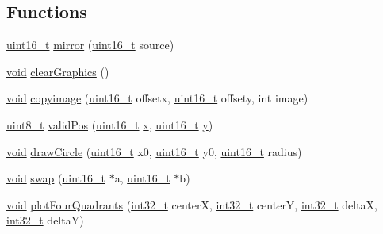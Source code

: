 \subsection*{Functions}
\begin{DoxyCompactItemize}
\item 
\hyperlink{stdint_8h_a273cf69d639a59973b6019625df33e30}{uint16\-\_\-t} \hyperlink{group___o_s_d_g_e_n_module_ga5a45071c8d6dc7fb048d5f791831b868}{mirror} (\hyperlink{stdint_8h_a273cf69d639a59973b6019625df33e30}{uint16\-\_\-t} source)
\item 
\hyperlink{group___n_a_m_e_ga18028b8badbf1ea7e704ccac3c488e82}{void} \hyperlink{group___o_s_d_g_e_n_module_gaef4730e1cc093c1b98a70d8e9241c3de}{clear\-Graphics} ()
\item 
\hyperlink{group___n_a_m_e_ga18028b8badbf1ea7e704ccac3c488e82}{void} \hyperlink{group___o_s_d_g_e_n_module_gaddad1c4131ec096796b78d23a4082da6}{copyimage} (\hyperlink{stdint_8h_a273cf69d639a59973b6019625df33e30}{uint16\-\_\-t} offsetx, \hyperlink{stdint_8h_a273cf69d639a59973b6019625df33e30}{uint16\-\_\-t} offsety, int image)
\item 
\hyperlink{stdint_8h_aba7bc1797add20fe3efdf37ced1182c5}{uint8\-\_\-t} \hyperlink{group___o_s_d_g_e_n_module_ga2f47e18d66eab4b942c583d519b122d8}{valid\-Pos} (\hyperlink{stdint_8h_a273cf69d639a59973b6019625df33e30}{uint16\-\_\-t} \hyperlink{pios__opahrs__proto_8h_ad0da36b2558901e21e7a30f6c227a45e}{x}, \hyperlink{stdint_8h_a273cf69d639a59973b6019625df33e30}{uint16\-\_\-t} \hyperlink{pios__opahrs__proto_8h_aa4f0d3eebc3c443f9be81bf48561a217}{y})
\item 
\hyperlink{group___n_a_m_e_ga18028b8badbf1ea7e704ccac3c488e82}{void} \hyperlink{group___o_s_d_g_e_n_module_ga62264c6d524275901f3a3f4d43a13353}{draw\-Circle} (\hyperlink{stdint_8h_a273cf69d639a59973b6019625df33e30}{uint16\-\_\-t} x0, \hyperlink{stdint_8h_a273cf69d639a59973b6019625df33e30}{uint16\-\_\-t} y0, \hyperlink{stdint_8h_a273cf69d639a59973b6019625df33e30}{uint16\-\_\-t} radius)
\item 
\hyperlink{group___n_a_m_e_ga18028b8badbf1ea7e704ccac3c488e82}{void} \hyperlink{group___o_s_d_g_e_n_module_ga6079548d874cda431d71e15174ff375c}{swap} (\hyperlink{stdint_8h_a273cf69d639a59973b6019625df33e30}{uint16\-\_\-t} $\ast$a, \hyperlink{stdint_8h_a273cf69d639a59973b6019625df33e30}{uint16\-\_\-t} $\ast$b)
\item 
\hyperlink{group___n_a_m_e_ga18028b8badbf1ea7e704ccac3c488e82}{void} \hyperlink{group___o_s_d_g_e_n_module_ga3fc15f51865688e662571a829c21a3ec}{plot\-Four\-Quadrants} (\hyperlink{group___n_a_m_e_gafd12020da5a235dfcf0c3c748fb5baed}{int32\-\_\-t} center\-X, \hyperlink{group___n_a_m_e_gafd12020da5a235dfcf0c3c748fb5baed}{int32\-\_\-t} center\-Y, \hyperlink{group___n_a_m_e_gafd12020da5a235dfcf0c3c748fb5baed}{int32\-\_\-t} delta\-X, \hyperlink{group___n_a_m_e_gafd12020da5a235dfcf0c3c748fb5baed}{int32\-\_\-t} delta\-Y)

\end{DoxyCompactItemize}
